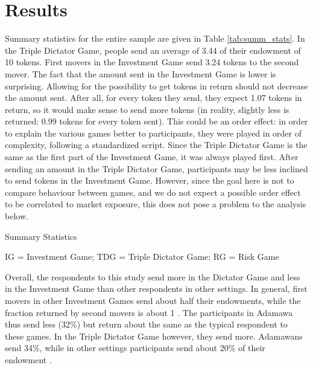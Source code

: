 \section{Results}
\raggedbottom
Summary statistics for the entire sample are given in Table \ref{tab:summ_stats}. In the Triple Dictator Game, people send an average of 3.44 of their endowment of 10 tokens. First movers in the Investment Game send 3.24 tokens to the second mover. The fact that the amount sent in the Investment Game is lower is surprising. Allowing for the possibility to get tokens in return should not decrease the amount sent. After all, for every token they send, they expect 1.07 tokens in return, so it would make sense to send more tokens (in reality, slightly less is returned: 0.99 tokens for every token sent). This could be an order effect: in order to explain the various games better to participants, they were played in order of complexity, following a standardized script. Since the Triple Dictator Game is the same as the first part of the Investment Game, it was always played first. After sending an amount in the Triple Dictator Game, participants may be less inclined to send tokens in the Investment Game. However, since the goal here is not to compare behaviour between games, and we do not expect a possible order effect to be correlated to market exposure, this does not pose a problem to the analysis below.
 
\begin{threeparttable}[p!]
	\caption{Summary Statistics}
	\label{tab:summ_stats}
	\centering
	
	\begin{tablenotes}
		\item IG = Investment Game; TDG = Triple Dictator Game; RG = Risk Game
		\item
	\end{tablenotes}

\end{threeparttable}

Overall, the respondents to this study send more in the Dictator Game and less in the Investment Game than other respondents in other settings. In general, first movers in other Investment Games send about half their endowments, while the fraction returned by second movers is about 1 \cite[see e.g.][]{Camerer2003,Bohnet2007}. The participants in Adamawa thus send less (32\%) but return about the same as the typical respondent to these games. In the Triple Dictator Game however, they send more.  Adamawans send 34\%, while in other settings participants send about 20\% of their endowment \citep{Bohnet2007,Ashraf2006}.

